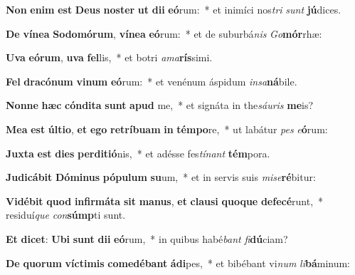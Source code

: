 \item \textbf{Non} \textbf{e}\textbf{nim} \textbf{est} \textbf{De}\textbf{us} \textbf{nos}\textbf{ter} \textbf{ut} \textbf{di}\textbf{i} \textbf{e}\textbf{ó}rum:~* et inimíci nos\textit{tri} \textit{sunt} \textbf{jú}dices.
\item \textbf{De} \textbf{ví}\textbf{ne}\textbf{a} \textbf{So}\textbf{do}\textbf{mó}\textbf{rum}, \textbf{ví}\textbf{ne}\textbf{a} \textbf{e}\textbf{ó}rum:~* et de suburbá\textit{nis} \textit{Go}\textbf{mór}rhæ:
\item \textbf{U}\textbf{va} \textbf{e}\textbf{ó}\textbf{rum}, \textbf{u}\textbf{va} \textbf{fel}lis,~* et botri \textit{a}\textit{ma}\textbf{rís}simi.
\item \textbf{Fel} \textbf{dra}\textbf{có}\textbf{num} \textbf{vi}\textbf{num} \textbf{e}\textbf{ó}rum:~* et venénum áspidum \textit{in}\textit{sa}\textbf{ná}bile.
\item \textbf{Non}\textbf{ne} \textbf{hæc} \textbf{cón}\textbf{di}\textbf{ta} \textbf{sunt} \textbf{a}\textbf{pud} me,~* et signáta in the\textit{sáu}\textit{ris} \textbf{me}is?
\item \textbf{Me}\textbf{a} \textbf{est} \textbf{úl}\textbf{ti}\textbf{o}, \textbf{et} \textbf{e}\textbf{go} \textbf{re}\textbf{trí}\textbf{bu}\textbf{am} \textbf{in} \textbf{tém}\textbf{po}re,~* ut labátur \textit{pes} \textit{e}\textbf{ó}rum:
\item \textbf{Jux}\textbf{ta} \textbf{est} \textbf{di}\textbf{es} \textbf{per}\textbf{di}\textbf{ti}\textbf{ó}nis,~* et adésse fes\textit{tí}\textit{nant} \textbf{tém}pora.
\item \textbf{Ju}\textbf{di}\textbf{cá}\textbf{bit} \textbf{Dó}\textbf{mi}\textbf{nus} \textbf{pó}\textbf{pu}\textbf{lum} \textbf{su}um,~* et in servis suis \textit{mi}\textit{se}\textbf{ré}bitur:
\item \textbf{Vi}\textbf{dé}\textbf{bit} \textbf{quod} \textbf{in}\textbf{fir}\textbf{má}\textbf{ta} \textbf{sit} \textbf{ma}\textbf{nus}, \textbf{et} \textbf{clau}\textbf{si} \textbf{quo}\textbf{que} \textbf{de}\textbf{fe}\textbf{cé}runt,~* residuí\textit{que} \textit{con}\textbf{súmp}ti sunt.
\item \textbf{Et} \textbf{di}\textbf{cet}: \textbf{U}\textbf{bi} \textbf{sunt} \textbf{di}\textbf{i} \textbf{e}\textbf{ó}rum,~* in quibus habé\textit{bant} \textit{fi}\textbf{dú}ciam?
\item \textbf{De} \textbf{quo}\textbf{rum} \textbf{víc}\textbf{ti}\textbf{mis} \textbf{com}\textbf{e}\textbf{dé}\textbf{bant} \textbf{á}\textbf{di}pes,~* et bibébant vi\textit{num} \textit{li}\textbf{bá}minum:
